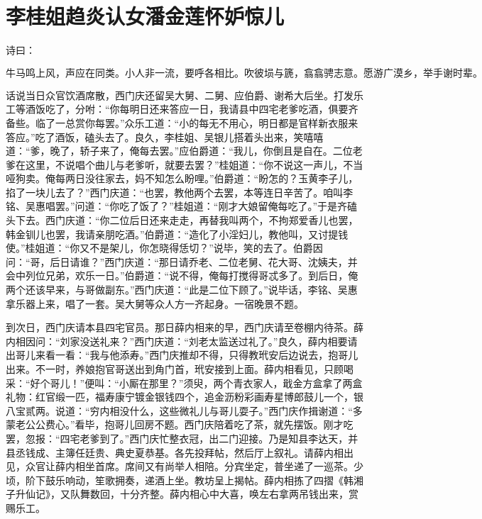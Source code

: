 

\chapter{李桂姐趋炎认女\KG 潘金莲怀妒惊儿}


诗曰：

\[
牛马鸣上风，声应在同类。小人非一流，要呼各相比。
吹彼埙与篪，翕翕骋志意。愿游广漠乡，举手谢时辈。
\]

话说当日众官饮酒席散，西门庆还留吴大舅、二舅、应伯爵、谢希大后坐。打发乐工等酒饭吃了，分咐：“你每明日还来答应一日，我请县中四宅老爹吃酒，俱要齐备些。临了一总赏你每罢。”众乐工道：“小的每无不用心，明日都是官样新衣服来答应。”吃了酒饭，磕头去了。良久，李桂姐、吴银儿搭着头出来，笑嘻嘻道：“爹，晚了，轿子来了，俺每去罢。”应伯爵道：“我儿，你倒且是自在。二位老爹在这里，不说唱个曲儿与老爹听，就要去罢？”桂姐道：“你不说这一声儿，不当哑狗卖。俺每两日没往家去，妈不知怎么盼哩。”伯爵道：“盼怎的？玉黄李子儿，掐了一块儿去了？”西门庆道：“也罢，教他两个去罢，本等连日辛苦了。咱叫李铭、吴惠唱罢。”问道：“你吃了饭了？”桂姐道：“刚才大娘留俺每吃了。”于是齐磕头下去。西门庆道：“你二位后日还来走走，再替我叫两个，不拘郑爱香儿也罢，韩金钏儿也罢，我请亲朋吃酒。”伯爵道：“造化了小淫妇儿，教他叫，又讨提钱使。”桂姐道：“你又不是架儿，你怎晓得恁切？”说毕，笑的去了。伯爵因问：“哥，后日请谁？”西门庆道：“那日请乔老、二位老舅、花大哥、沈姨夫，并会中列位兄弟，欢乐一日。”伯爵道：“说不得，俺每打搅得哥忒多了。到后日，俺两个还该早来，与哥做副东。”西门庆道：“此是二位下顾了。”说毕话，李铭、吴惠拿乐器上来，唱了一套。吴大舅等众人方一齐起身。一宿晚景不题。

到次日，西门庆请本县四宅官员。那日薛内相来的早，西门庆请至卷棚内待茶。薛内相因问：“刘家没送礼来？”西门庆道：“刘老太监送过礼了。”良久，薛内相要请出哥儿来看一看：“我与他添寿。”西门庆推却不得，只得教玳安后边说去，抱哥儿出来。不一时，养娘抱官哥送出到角门首，玳安接到上面。薛内相看见，只顾喝采：“好个哥儿！”便叫：“小厮在那里？”须臾，两个青衣家人，戢金方盒拿了两盒礼物：\textHuoShan 红官缎一匹，福寿康宁镀金银钱四个，追金沥粉彩画寿星博郎鼓儿一个，银八宝贰两。说道：“穷内相没什么，这些微礼儿与哥儿耍子。”西门庆作揖谢道：“多蒙老公公费心。”看毕，抱哥儿回房不题。西门庆陪着吃了茶，就先摆饭。刚才吃罢，忽报：“四宅老爹到了。”西门庆忙整衣冠，出二门迎接。乃是知县李达天，并县丞钱成、主簿任廷贵、典史夏恭基。各先投拜帖，然后厅上叙礼。请薛内相出见，众官让薛内相坐首席。席间又有尚举人相陪。分宾坐定，普坐递了一巡茶。少顷，阶下鼓乐响动，笙歌拥奏，递酒上坐。教坊呈上揭帖。薛内相拣了四摺《韩湘子升仙记》，又队舞数回，十分齐整。薛内相心中大喜，唤左右拿两吊钱出来，赏赐乐工。

